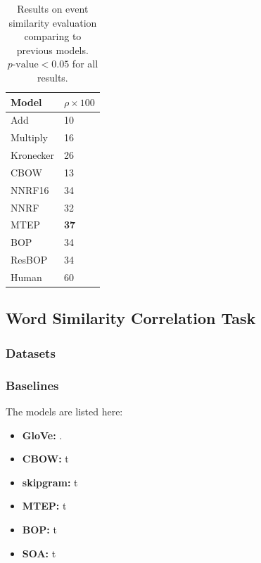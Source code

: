 \documentclass[a4paper]{article}
\begin{document}
\begin{table}[t]
\centering
\begin{tabular}{ll}
\textbf{Model}  &   \textbf{$\rho \times 100$}  \\ \hline  \hline
Add         &   10    \\
Multiply    &   16    \\
Kronecker   &   26    \\  \hline
CBOW        &   13    \\
NNRF16      &   34    \\  \hline
NNRF        &   32    \\
MTEP        &\textbf{37}\\
BOP         &   34    \\
ResBOP      &   34    \\  \hline  \hline
Human       &   60    \\
\end{tabular}
\caption{\label{tab:GS} Results on event similarity evaluation comparing to previous models. $p\text{-value} < 0.05$ for all results. }
\end{table}



\subsection{Word Similarity Correlation Task}  \label{sec:wordsim}
% 
% 
\subsubsection{Datasets} \label{sec:dataset-wordsim}

\subsubsection{Baselines} \label{sec:baselines-wordsim}
The models are listed here: 
\begin{itemize}
  \item \textbf{GloVe: }  \citet{pennington2014glove}.
  \item \textbf{CBOW: }   t
  \item \textbf{skipgram: } t
  \item \textbf{MTEP: }   t
  \item \textbf{BOP: }    t
  \item \textbf{SOA: }    t
\end{itemize}
\end{document}
